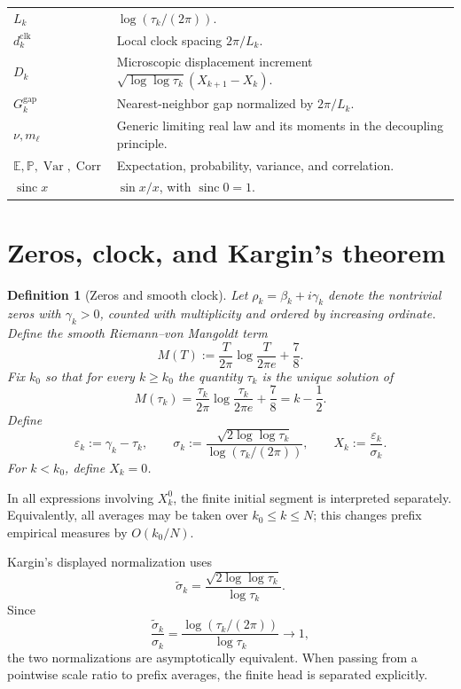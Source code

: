 \documentclass[pdflatex,sn-mathphys-num]{sn-jnl}
\numberwithin{equation}{section}
\theoremstyle{thmstyleone}
\theoremstyle{thmstylethree}
\newtheorem{definition}[theorem]{Definition}
\theoremstyle{thmstyletwo}
\newcommand{\E}{\mathbb E}
\newcommand{\Var}{\operatorname{Var}}
\newcommand{\Corr}{\operatorname{Corr}}
\newcommand{\sinc}{\operatorname{sinc}}
\newcommand{\1}{\mathbf 1}
\newcommand{\Prob}{\mathbb P}
\begin{document}
\begin{longtable}{@{}p{}p{}@{}}
\(L_k\) & \(\log(\tau_k/(2\pi))\).\\
\(d_k^{\mathrm{clk}}\) & Local clock spacing \(2\pi/L_k\).\\
\(D_k\) & Microscopic displacement increment \(\sqrt{\log\log\tau_k}(X_{k+1}-X_k)\).\\
\(G_k^{\mathrm{gap}}\) & Nearest-neighbor gap normalized by \(2\pi/L_k\).\\
\(\nu,m_\ell\) & Generic limiting real law and its moments in the decoupling principle.\\
\(\E,\Prob,\Var,\Corr\) & Expectation, probability, variance, and correlation.\\
\(\sinc x\) & \(\sin x/x\), with \(\sinc 0=1\).\\
\bottomrule
\end{longtable}


\section{Zeros, clock, and Kargin's theorem}

\begin{definition}[Zeros and smooth clock]
Let $\rho_k=\beta_k+i\gamma_k$ denote the nontrivial zeros with $\gamma_k>0$, counted with multiplicity and ordered by increasing ordinate.  Define the smooth Riemann--von Mangoldt term
\[
 M(T):=\frac{T}{2\pi}\log\frac{T}{2\pi e}+\frac78.
\]
Fix $k_0$ so that for every $k\ge k_0$ the quantity $\tau_k$ is the unique solution of
\begin{equation}
 M(\tau_k)
 =\frac{\tau_k}{2\pi}\log\frac{\tau_k}{2\pi e}+\frac78
 =k-\frac12.
\label{eq:clock}
\end{equation}
Define
\begin{equation}
 \varepsilon_k:=\gamma_k-\tau_k,
 \qquad
 \sigma_k:=\frac{\sqrt{2\log\log\tau_k}}{\log(\tau_k/(2\pi))},
 \qquad
 X_k:=\frac{\varepsilon_k}{\sigma_k}.
\label{eq:X}
\end{equation}
For $k<k_0$, define $X_k=0$.
\end{definition}

In all expressions involving \(X_k^0\), the finite initial segment is
interpreted separately.
Equivalently, all averages may be taken over \(k_0\le k\le N\);
this changes prefix empirical measures by \(O(k_0/N)\).

Kargin's displayed normalization uses
\[
 \widetilde\sigma_k=\frac{\sqrt{2\log\log\tau_k}}{\log\tau_k}.
\]
Since
\[
 \frac{\widetilde\sigma_k}{\sigma_k}
 =\frac{\log(\tau_k/(2\pi))}{\log\tau_k}\longrightarrow1,
\]
the two normalizations are asymptotically equivalent.  When passing from a pointwise scale ratio to prefix averages, the finite head is separated explicitly.
\end{document}
